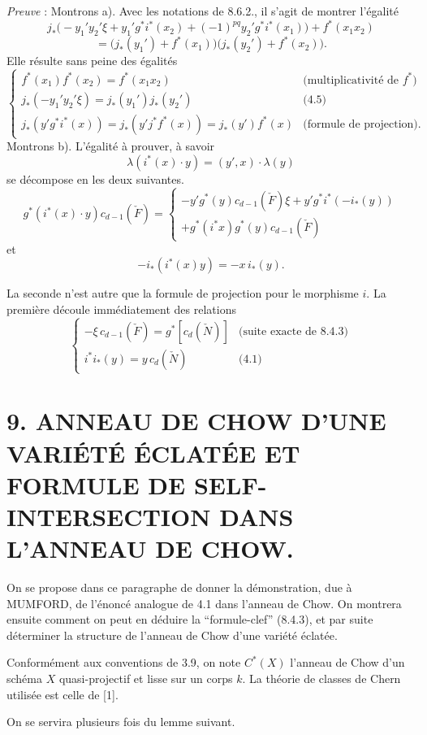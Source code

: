 \documentclass[11pt]{article}
\begin{document}
\emph{Preuve} : Montrons a). Avec les notations de 8.6.2., il s'agit de montrer l'égalité
\[
j_*\bigl(-y_1'y_2'\xi+y_1'g^*i^*(x_2)+(-1)^{pq}y_2'g^*i^*(x_1)\bigr)+f^*(x_1x_2)
\]
\[
=\bigl(j_*(y_1')+f^*(x_1)\bigr)\bigl(j_*(y_2')+f^*(x_2)\bigr).
\]
Elle résulte sans peine des égalités
\[
\begin{cases}
f^*(x_1)f^*(x_2)=f^*(x_1x_2)&\text{(multiplicativité de }f^*\text{)}\\
j_*(-y_1'y_2'\xi)=j_*(y_1')j_*(y_2')&\text{(4.5)}\\
j_*(y'g^*i^*(x))=j_*(y'j^*f^*(x))=j_*(y')f^*(x)&\text{(formule de projection)}.
\end{cases}
\]
Montrons b). L'égalité à prouver, à savoir
\[
\lambda(i^*(x)\cdot y)=(y',x)\cdot\lambda(y)
\]
se décompose en les deux suivantes.
\[
g^*(i^*(x)\cdot y)c_{d-1}(\check F)
=
\begin{cases}
-y'g^*(y)c_{d-1}(\check F)\xi+y'g^*i^*(-i_*(y))\\
+g^*(i^*x)g^*(y)c_{d-1}(\check F)
\end{cases}
\]
et
\[
-i_*(i^*(x)y)=-x\,i_*(y).
\]

La seconde n'est autre que la formule de projection pour le morphisme $i$. La première découle immédiatement des relations
\[
\begin{cases}
-\xi\,c_{d-1}(\check F)=g^*[c_d(\check N)]&\text{(suite exacte de 8.4.3)}\\
i^*i_*(y)=y\,c_d(\check N)&\text{(4.1)}
\end{cases}
\]

\section*{9. ANNEAU DE CHOW D'UNE VARIÉTÉ ÉCLATÉE ET FORMULE DE SELF-INTERSECTION DANS L'ANNEAU DE CHOW.}

On se propose dans ce paragraphe de donner la démonstration, due à MUMFORD, de l'énoncé analogue de 4.1 dans l'anneau de Chow. On montrera ensuite comment on peut en déduire la ``formule-clef'' (8.4.3), et par suite déterminer la structure de l'anneau de Chow d'une variété éclatée.

Conformément aux conventions de 3.9, on note $C^*(X)$ l'anneau de Chow d'un schéma $X$ quasi-projectif et lisse sur un corps $k$. La théorie de classes de Chern utilisée est celle de [1].

On se servira plusieurs fois du lemme suivant.
\end{document}
